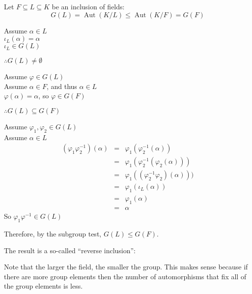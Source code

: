 \documentclass[letterpaper,12pt,fleqn]{article}
\newcommand{\vp}{\varphi}
\renewcommand{\a}{\alpha}
\renewcommand{\i}{\iota}
\DeclareMathOperator{\Aut}{Aut}
\DeclareMathOperator{\id}{id}
\begin{document}
\begin{theorem}
  Let $F\subseteq L\subseteq K$ be an inclusion of fields:
  \[G(L)=\Aut(K/L)\le\Aut(K/F)=G(F)\]
\end{theorem}
\newpage
\begin{theproof}
  Assume $\a\in L$ \\
  $\i_L(\a)=\a$ \\
  $\i_L\in G(L)$

  $\therefore G(L)\ne\emptyset$

  Assume $\vp\in G(L)$ \\
  Assume $\a\in F$, and thus $\a\in L$ \\
  $\vp(\a)=\a$, so $\vp\in G(F)$

  $\therefore G(L)\subseteq G(F)$

  Assume $\vp_1,\vp_2\in G(L)$ \\
  Assume $\a\in L$
  \begin{eqnarray*}
    (\vp_1\vp_2^{-1})(\a) &=& \vp_1(\vp_2^{-1}(\a)) \\
    &=& \vp_1(\vp_2^{-1}(\vp_2(\a))) \\
    &=& \vp_1((\vp_2^{-1}\vp_2)(\a))) \\
    &=& \vp_1(\i_L(\a)) \\
    &=& \vp_1(\a) \\
    &=& \a
  \end{eqnarray*}
  So $\vp_1\vp^{-1}\in G(L)$

  Therefore, by the subgroup test, $G(L)\le G(F)$.
\end{theproof}

The result is a so-called ``reverse inclusion'':

\bigskip


Note that the larger the field, the smaller the group. This makes sense
because if there are more group elements then the number of automorphisms that
fix all of the group elements is less.
\end{document}
